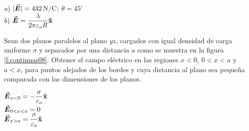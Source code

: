\begin{Answer}
  \begin{minipage}[t]{.4\textwidth}
    \textit{a}) $|\va*{E}| = \SI{432}{\newton/\coulomb}$; $\theta = 45^\circ$\\ \textit{b}) $\va*{E} = \dfrac{\lambda}{2\pi\varepsilon_o R}\vu{x}$
  \end{minipage}
\end{Answer}
%
\begin{center}
\end{center}
%
\begin{center}
\end{center}
%
\begin{Exercise}\label{p:continuas08}
  Sean dos planos paralelos al plano $yz$, cargados con igual densidad de carga uniforme $\sigma$ y separados por una distancia $a$ como se muestra en la figura \ref{f:continuas08}. Obtener el campo eléctrico en las regiones $x<0$, $0<x<a$ y $a<x$, para puntos alejados de los bordes y cuya distancia al plano sea pequeña comparada con las dimensiones de los planos.
\end{Exercise}
\begin{Answer}
  \begin{minipage}[t]{.4\textwidth}
    $\va*{E}_{x<0} = -\dfrac{\sigma}{\varepsilon_o} \vu{x}$\\ $\va*{E}_{0<x<a} = 0$\\ $\va*{E}_{x>a} = \dfrac{\sigma}{\varepsilon_o} \vu{x}$
  \end{minipage}
\end{Answer}
%
